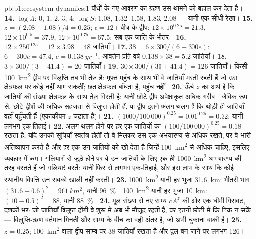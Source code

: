 \begin{solution}{pb:b1:ecosystem-dynamics:1}
पौधों के नए आवरण का ग्रहण उस थामने को बहाल कर देता है।
\textbf{14.} $\log A$: 0, 1, 2, 3, 4; $\log S$: 1.08, 1.32, 1.58,
1.83, 2.08 --- यानी एक सीधी रेखा।
\textbf{15.} $z = (2.08 - 1.08)/4 = 0.25$; $c = 12$। बीच के द्वीप:
$12\times 10^{0.25} = 21.3$, $12\times 10^{0.5} = 37.9$, $12\times
10^{0.75} = 67.5$: सब एक जाति के भीतर।
\textbf{16.} $12\times 250^{0.25} = 12\times 3.98 = 48$ जातियाँ।
\textbf{17.} $38 = 6\times 300/(6 + 300e)$: $6 + 300e = 47.4$, $e =
\qty{0.138}{yr^{-1}}$; आवर्तन प्रति वर्ष $0.138\times 38 = 5.2$ जातियाँ।
\textbf{18.} $3\times 300/(3 + 41.4) = 20$ जातियाँ।
\textbf{19.} $30\times 300/(30 + 41.4) = 126$ जातियाँ। किसी
\qty{100}{km^2} द्वीप पर विलुप्ति तब भी तेज़ है: मुफ़्त पहुँच के साथ भी
वे जातियाँ मरती रहती हैं जो उस क्षेत्रफल पर कोई  नहीं थाम सकतीं;
छत क्षेत्रफल बाँधता है, पहुँच नहीं।
\textbf{20.} ऊँचे $z$ का अर्थ है कि जातियों की संख्या क्षेत्रफल के साथ
तेज़ गिरती है: यानी छोटे द्वीप अपेक्षाकृत अधिक गरीब। जैविक रूप से,
छोटे द्वीपों की  अधिक सहजता से विलुप्त होती हैं, या द्वीप इतने
अलग-थलग हैं कि थोड़ी ही जातियाँ वहाँ पहुँचती हैं (एकाकीपन $z$ चढ़ाता है)।
\textbf{21.} $(1000/100\,000)^{0.25} = 0.01^{0.25} = 0.32$: यानी लगभग
एक-तिहाई।
\textbf{22.} अलग-थलग होने पर हर एक जातियों का $(100/100\,000)^{0.25} = 0.18$
रखता है; यदि उनकी सूचियाँ स्वतंत्र होतीं तो वे मिलकर उस एक अभयारण्य से
अधिक रखते, पर वे भारी अतिव्यापन करते हैं और हर एक उन जातियों को खो देता है
जिन्हें \qty{100}{km^2} से अधिक चाहिए, इसलिए व्यवहार में कम।
गलियारों से जुड़े होने पर वे उन जातियों के लिए एक ही \qty{1000}{km^2}
अभयारण्य की तरह बरतते हैं जो गलियारे बरतें: यानी फिर से लगभग एक-तिहाई, और
इस लाभ के साथ कि कोई स्थानीय विपत्ति उन सबको खाली नहीं करती।
\textbf{23.} \qty{1000}{km^2} यानी हर भुजा \qty{31.6}{km}: भीतरी भाग
$(31.6 - 0.6)^2 = \qty{961}{km^2}$, यानी \qty{96}{\%}। \qty{100}{km^2}
यानी हर भुजा \qty{10}{km}: $(10 - 0.6)^2 = 88$, यानी \qty{88}{\%}।
\textbf{24.} मूल संख्या से नए साम्य $cA^z$ की ओर एक धीमी गिरावट,
दशकों भर: जो जातियाँ विलुप्त होंगी वे शुरू में अब भी मौजूद रहती हैं,
पर इतनी छोटी  में कि टिक न सकें ---
विलुप्ति-ऋण वर्तमान गिनती और साम्य के बीच का वही अंतर है, जो अभी चुकाना
बाकी है।
\textbf{25.} $z = 0.25$; \qty{100}{km^2} वाला द्वीप साम्य पर \num{38}
जातियाँ रखता है और पुल बन जाने पर लगभग \num{126}।
\end{solution}
